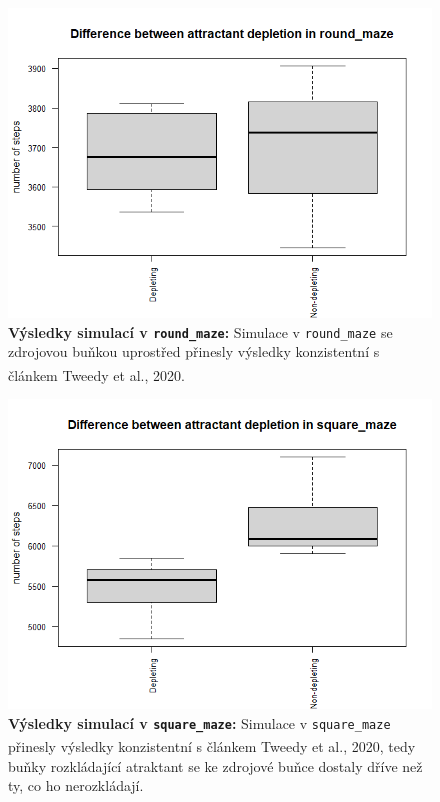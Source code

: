 \documentclass[10pt,a4paper,twocolumn]{article}
\begin{document}
\begin{figure}[tb]
  \centering
  \includegraphics[width=0.98\linewidth]{images/round.png}
  \caption{\textbf{Výsledky simulací v \texttt{round\_maze}:} 
  Simulace v \texttt{round\_maze} se zdrojovou buňkou uprostřed přinesly výsledky konzistentní s článkem Tweedy et al., 2020\textsuperscript{\cite{tweedy2020}}.}
  \label{fig:round}
\end{figure} 

\begin{figure}[tb]
  \centering
  \includegraphics[width=0.98\linewidth]{images/square.png}
  \caption{\textbf{Výsledky simulací v \texttt{square\_maze}:} 
  Simulace v \texttt{square\_maze} přinesly výsledky konzistentní s článkem Tweedy et al., 2020\textsuperscript{\cite{tweedy2020}}, tedy buňky rozkládající atraktant se ke zdrojové buňce dostaly dříve než ty, co ho nerozkládají.}
  \label{fig:square}
\end{figure} 
\end{document}
